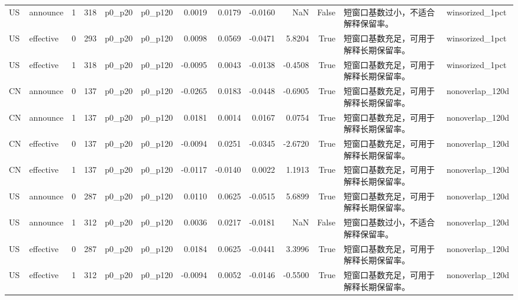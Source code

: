 \begin{tabular}{llrrllrrrrrll}
US & announce & 1 & 318 & p0_p20 & p0_p120 & 0.0019 & 0.0179 & -0.0160 & NaN & False & 短窗口基数过小，不适合解释保留率。 & winsorized_1pct \\
US & effective & 0 & 293 & p0_p20 & p0_p120 & 0.0098 & 0.0569 & -0.0471 & 5.8204 & True & 短窗口基数充足，可用于解释长期保留率。 & winsorized_1pct \\
US & effective & 1 & 318 & p0_p20 & p0_p120 & -0.0095 & 0.0043 & -0.0138 & -0.4508 & True & 短窗口基数充足，可用于解释长期保留率。 & winsorized_1pct \\
CN & announce & 0 & 137 & p0_p20 & p0_p120 & -0.0265 & 0.0183 & -0.0448 & -0.6905 & True & 短窗口基数充足，可用于解释长期保留率。 & nonoverlap_120d \\
CN & announce & 1 & 137 & p0_p20 & p0_p120 & 0.0181 & 0.0014 & 0.0167 & 0.0754 & True & 短窗口基数充足，可用于解释长期保留率。 & nonoverlap_120d \\
CN & effective & 0 & 137 & p0_p20 & p0_p120 & -0.0094 & 0.0251 & -0.0345 & -2.6720 & True & 短窗口基数充足，可用于解释长期保留率。 & nonoverlap_120d \\
CN & effective & 1 & 137 & p0_p20 & p0_p120 & -0.0117 & -0.0140 & 0.0022 & 1.1913 & True & 短窗口基数充足，可用于解释长期保留率。 & nonoverlap_120d \\
US & announce & 0 & 287 & p0_p20 & p0_p120 & 0.0110 & 0.0625 & -0.0515 & 5.6899 & True & 短窗口基数充足，可用于解释长期保留率。 & nonoverlap_120d \\
US & announce & 1 & 312 & p0_p20 & p0_p120 & 0.0036 & 0.0217 & -0.0181 & NaN & False & 短窗口基数过小，不适合解释保留率。 & nonoverlap_120d \\
US & effective & 0 & 287 & p0_p20 & p0_p120 & 0.0184 & 0.0625 & -0.0441 & 3.3996 & True & 短窗口基数充足，可用于解释长期保留率。 & nonoverlap_120d \\
US & effective & 1 & 312 & p0_p20 & p0_p120 & -0.0094 & 0.0052 & -0.0146 & -0.5500 & True & 短窗口基数充足，可用于解释长期保留率。 & nonoverlap_120d \\
\bottomrule
\end{tabular}
